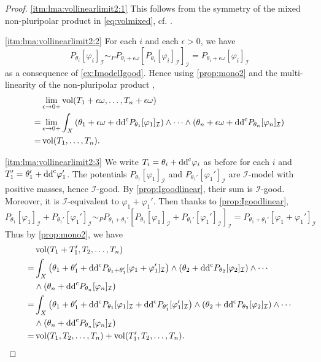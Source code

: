 \begin{proof}
    \ref{itm:lma:vollinearlimit2:1} This follows from the symmetry of the mixed non-pluripolar product in \eqref{eq:volmixed}, cf. .

    \ref{itm:lma:vollinearlimit2:2} For each $i$ and each $\epsilon>0$, we have
    \[
        P_{\theta_i}[\varphi_i]_{\mathcal{I}}\sim_P P_{\theta_i+\epsilon\omega}\left[P_{\theta_i}[\varphi_i]_{\mathcal{I}}\right]_{\mathcal{I}}=P_{\theta_i+\epsilon\omega}[\varphi_i]_{\mathcal{I}}
    \]
    as a consequence of \cref{ex:ImodelIgood}. Hence using \cref{prop:mono2} and the multi-linearity of the non-pluripolar product ,
    \[
        \begin{aligned}
            &\lim_{\epsilon\to 0+}\operatorname{vol}(T_1+\epsilon\omega,\ldots,T_n+\epsilon\omega)\\
            =&\lim_{\epsilon\to 0+}\int_X \left(\theta_1+\epsilon\omega+\mathrm{dd}^{\mathrm{c}} P_{\theta_1}[\varphi_1]_{\mathcal{I}}\right)\wedge \cdots \wedge \left(\theta_n+\epsilon\omega+\mathrm{dd}^{\mathrm{c}} P_{\theta_n}[\varphi_n]_{\mathcal{I}}\right)\\
            =& \operatorname{vol}(T_1,\ldots,T_n).
        \end{aligned}
    \]

    \ref{itm:lma:vollinearlimit2:3}
    We write $T_i=\theta_i+\mathrm{dd}^{\mathrm{c}} \varphi_i$ as before for each $i$ and $T_1'=\theta_1'+\mathrm{dd}^{\mathrm{c}} \varphi_1'$.
    The potentials $P_{\theta_1}[\varphi_1]_{\mathcal I}$ and $P_{\theta_1'}[\varphi_1']_{\mathcal I}$ are $\mathcal I$-model with positive masses, hence $\mathcal I$-good. By \cref{prop:Igoodlinear}, their sum is $\mathcal I$-good. Moreover, it is $\mathcal I$-equivalent to $\varphi_1+\varphi_1'$. Then thanks to \cref{prop:Igoodlinear},
    \[
    P_{\theta_1}[\varphi_1]_{\mathcal{I}}+P_{\theta_1'}[\varphi_1']_{\mathcal{I}}\sim_P P_{\theta_1+\theta_1'}\left[P_{\theta_1}[\varphi_1]_{\mathcal{I}}+P_{\theta_1'}[\varphi_1']_{\mathcal{I}} \right]_{\mathcal{I}} = P_{\theta_1+\theta_1'}\left[\varphi_1+\varphi_1'\right]_{\mathcal{I}}
    \]
    Thus by \cref{prop:mono2}, we have
    \[
    \begin{aligned}
        &\operatorname{vol} (T_1+T_1',T_2,\ldots,T_n)\\
        =&\int_X \left( \theta_1+\theta_1'+\mathrm{dd}^{\mathrm{c}} P_{\theta_1+\theta_1'}[\varphi_1+\varphi_1']_{\mathcal{I}} \right)\wedge \left( \theta_2+\mathrm{dd}^{\mathrm{c}} P_{\theta_2}[\varphi_2]_{\mathcal{I}}\right)\wedge \cdots \\
        &\wedge  \left( \theta_n+\mathrm{dd}^{\mathrm{c}} P_{\theta_n}[\varphi_n]_{\mathcal{I}}\right)\\
        =&\int_X \left( \theta_1+\theta_1'+\mathrm{dd}^{\mathrm{c}} P_{\theta_1}[\varphi_1]_{\mathcal{I}}+\mathrm{dd}^{\mathrm{c}} P_{\theta_1'}[\varphi_1']_{\mathcal{I}} \right)\wedge \left( \theta_2+\mathrm{dd}^{\mathrm{c}} P_{\theta_2}[\varphi_2]_{\mathcal{I}}\right)\wedge \cdots \\
        &\wedge  \left( \theta_n+\mathrm{dd}^{\mathrm{c}} P_{\theta_n}[\varphi_n]_{\mathcal{I}}\right)\\
        =& \operatorname{vol} (T_1,T_2,\ldots,T_n)+\operatorname{vol} (T_1',T_2,\ldots,T_n).
    \end{aligned}
    \]


\end{proof}
